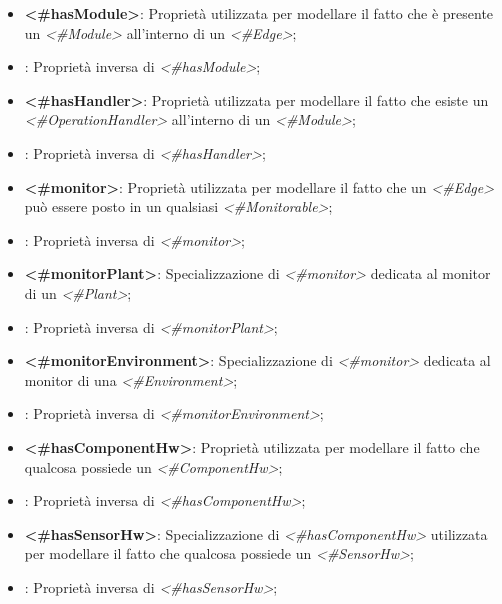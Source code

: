 \begin{itemize}
	\item \textbf{<\#hasModule>}: Proprietà utilizzata per modellare il fatto che è presente un \textit{<\#Module>} all'interno di un \textit{<\#Edge>};

	\item {}: Proprietà inversa di \textit{<\#hasModule>};

	\item \textbf{<\#hasHandler>}: Proprietà utilizzata per modellare il fatto che esiste un \textit{<\#OperationHandler>} all'interno di un \textit{<\#Module>};

	\item {}: Proprietà inversa di \textit{<\#hasHandler>};

	\item \textbf{<\#monitor>}: Proprietà utilizzata per modellare il fatto che un \textit{<\#Edge>} può essere posto in un qualsiasi \textit{<\#Monitorable>};

	\item {}: Proprietà inversa di \textit{<\#monitor>};

	\item \textbf{<\#monitorPlant>}: Specializzazione di \textit{<\#monitor>} dedicata al monitor di un \textit{<\#Plant>};

	\item {}: Proprietà inversa di \textit{<\#monitorPlant>};

	\item \textbf{<\#monitorEnvironment>}: Specializzazione di \textit{<\#monitor>} dedicata al monitor di una \textit{<\#Environment>};

	\item {}: Proprietà inversa di \textit{<\#monitorEnvironment>};

	\item \textbf{<\#hasComponentHw>}: Proprietà utilizzata per modellare il fatto che qualcosa possiede un \textit{<\#ComponentHw>};

	\item {}: Proprietà inversa di \textit{<\#hasComponentHw>};

	\item \textbf{<\#hasSensorHw>}: Specializzazione di \textit{<\#hasComponentHw>} utilizzata per modellare il fatto che qualcosa possiede un \textit{<\#SensorHw>};

	\item {}: Proprietà inversa di \textit{<\#hasSensorHw>};


\end{itemize}
